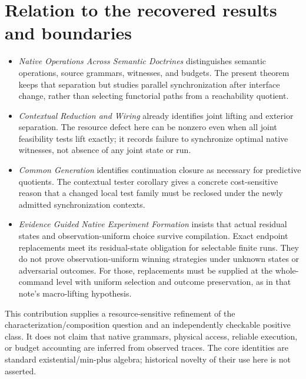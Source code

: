 \documentclass[11pt]{article}
\begin{document}
\section{Relation to the recovered results and boundaries}
\begin{itemize}
\item \emph{Native Operations Across Semantic Doctrines} distinguishes semantic operations, source grammars, witnesses, and budgets. The present theorem keeps that separation but studies parallel synchronization after interface change, rather than selecting functorial paths from a reachability quotient.
\item \emph{Contextual Reduction and Wiring} already identifies joint lifting and exterior separation. The resource defect here can be nonzero even when all joint feasibility tests lift exactly; it records failure to synchronize optimal native witnesses, not absence of any joint state or run.
\item \emph{Common Generation} identifies continuation closure as necessary for predictive quotients. The contextual tester corollary gives a concrete cost-sensitive reason that a changed local test family must be reclosed under the newly admitted synchronization contexts.
\item \emph{Evidence Guided Native Experiment Formation} insists that actual residual states and observation-uniform choice survive compilation. Exact endpoint replacements meet its residual-state obligation for selectable finite runs. They do not prove observation-uniform winning strategies under unknown states or adversarial outcomes. For those, replacements must be supplied at the whole-command level with uniform selection and outcome preservation, as in that note's macro-lifting hypothesis.
\end{itemize}
This contribution supplies a resource-sensitive refinement of the characterization/composition question and an independently checkable positive class. It does not claim that native grammars, physical access, reliable execution, or budget accounting are inferred from observed traces. The core identities are standard existential/min-plus algebra; historical novelty of their use here is not asserted.
\end{document}
